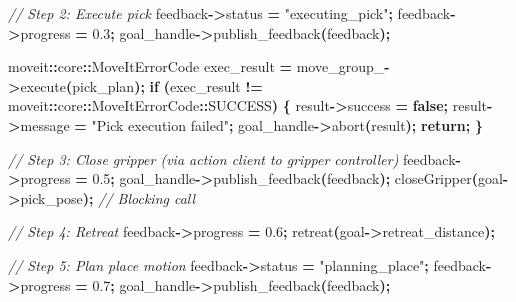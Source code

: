 \documentclass[
]{article}
\newenvironment{Shaded}{\begin{snugshade}}{\end{snugshade}}
\newcommand{\CommentTok}[1]{\textcolor[rgb]{0.56,0.35,0.01}{\textit{#1}}}
\newcommand{\ControlFlowTok}[1]{\textcolor[rgb]{0.13,0.29,0.53}{\textbf{#1}}}
\newcommand{\FloatTok}[1]{\textcolor[rgb]{0.00,0.00,0.81}{#1}}
\newcommand{\KeywordTok}[1]{\textcolor[rgb]{0.13,0.29,0.53}{\textbf{#1}}}
\newcommand{\NormalTok}[1]{#1}
\newcommand{\OperatorTok}[1]{\textcolor[rgb]{0.81,0.36,0.00}{\textbf{#1}}}
\newcommand{\StringTok}[1]{\textcolor[rgb]{0.31,0.60,0.02}{#1}}
\newcommand{\VariableTok}[1]{\textcolor[rgb]{0.00,0.00,0.00}{#1}}
\begin{document}
\begin{Shaded}
\begin{Highlighting}[]
        \CommentTok{// Step 2: Execute pick}
\NormalTok{        feedback}\OperatorTok{{-}\textgreater{}}\NormalTok{status }\OperatorTok{=} \StringTok{"executing\_pick"}\OperatorTok{;}
\NormalTok{        feedback}\OperatorTok{{-}\textgreater{}}\NormalTok{progress }\OperatorTok{=} \FloatTok{0.3}\OperatorTok{;}
\NormalTok{        goal\_handle}\OperatorTok{{-}\textgreater{}}\NormalTok{publish\_feedback}\OperatorTok{(}\NormalTok{feedback}\OperatorTok{);}

\NormalTok{        moveit}\OperatorTok{::}\NormalTok{core}\OperatorTok{::}\NormalTok{MoveItErrorCode exec\_result }\OperatorTok{=} \VariableTok{move\_group\_}\OperatorTok{{-}\textgreater{}}\NormalTok{execute}\OperatorTok{(}\NormalTok{pick\_plan}\OperatorTok{);}
        \ControlFlowTok{if} \OperatorTok{(}\NormalTok{exec\_result }\OperatorTok{!=}\NormalTok{ moveit}\OperatorTok{::}\NormalTok{core}\OperatorTok{::}\NormalTok{MoveItErrorCode}\OperatorTok{::}\NormalTok{SUCCESS}\OperatorTok{)} \OperatorTok{\{}
\NormalTok{            result}\OperatorTok{{-}\textgreater{}}\NormalTok{success }\OperatorTok{=} \KeywordTok{false}\OperatorTok{;}
\NormalTok{            result}\OperatorTok{{-}\textgreater{}}\NormalTok{message }\OperatorTok{=} \StringTok{"Pick execution failed"}\OperatorTok{;}
\NormalTok{            goal\_handle}\OperatorTok{{-}\textgreater{}}\NormalTok{abort}\OperatorTok{(}\NormalTok{result}\OperatorTok{);}
            \ControlFlowTok{return}\OperatorTok{;}
        \OperatorTok{\}}

        \CommentTok{// Step 3: Close gripper (via action client to gripper controller)}
\NormalTok{        feedback}\OperatorTok{{-}\textgreater{}}\NormalTok{progress }\OperatorTok{=} \FloatTok{0.5}\OperatorTok{;}
\NormalTok{        goal\_handle}\OperatorTok{{-}\textgreater{}}\NormalTok{publish\_feedback}\OperatorTok{(}\NormalTok{feedback}\OperatorTok{);}
\NormalTok{        closeGripper}\OperatorTok{(}\NormalTok{goal}\OperatorTok{{-}\textgreater{}}\NormalTok{pick\_pose}\OperatorTok{);}  \CommentTok{// Blocking call}

        \CommentTok{// Step 4: Retreat}
\NormalTok{        feedback}\OperatorTok{{-}\textgreater{}}\NormalTok{progress }\OperatorTok{=} \FloatTok{0.6}\OperatorTok{;}
\NormalTok{        retreat}\OperatorTok{(}\NormalTok{goal}\OperatorTok{{-}\textgreater{}}\NormalTok{retreat\_distance}\OperatorTok{);}

        \CommentTok{// Step 5: Plan place motion}
\NormalTok{        feedback}\OperatorTok{{-}\textgreater{}}\NormalTok{status }\OperatorTok{=} \StringTok{"planning\_place"}\OperatorTok{;}
\NormalTok{        feedback}\OperatorTok{{-}\textgreater{}}\NormalTok{progress }\OperatorTok{=} \FloatTok{0.7}\OperatorTok{;}
\NormalTok{        goal\_handle}\OperatorTok{{-}\textgreater{}}\NormalTok{publish\_feedback}\OperatorTok{(}\NormalTok{feedback}\OperatorTok{);}


\end{Highlighting}
\end{Shaded}
\end{document}
